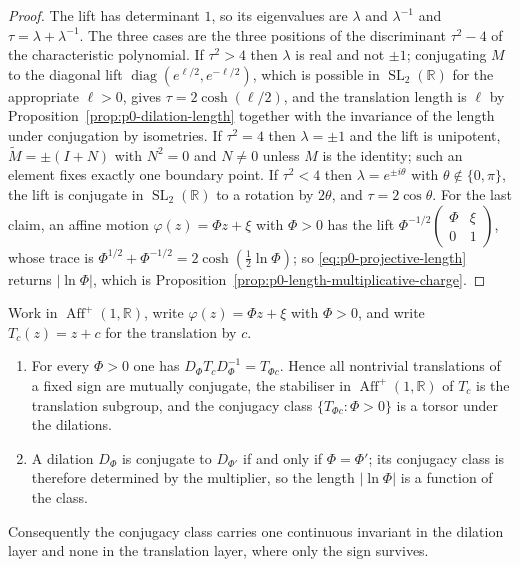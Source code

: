 \begin{proof}
The lift has determinant $1$, so its eigenvalues are $\lambda$ and $\lambda^{-1}$ and
$\tau=\lambda+\lambda^{-1}$.  The three cases are the three positions of the
discriminant $\tau^2-4$ of the characteristic polynomial.  If $\tau^2>4$ then
$\lambda$ is real and not $\pm1$; conjugating $M$ to the diagonal lift
$\operatorname{diag}(e^{\ell/2},e^{-\ell/2})$, which is possible in
$\operatorname{SL}_2(\mathbb R)$ for the appropriate $\ell>0$, gives
$\tau=2\cosh(\ell/2)$, and the translation length is $\ell$ by
Proposition~\ref{prop:p0-dilation-length} together with the invariance of the length
under conjugation by isometries.  If $\tau^2=4$ then $\lambda=\pm1$ and the lift is
unipotent, $\widetilde M=\pm(I+N)$ with $N^2=0$ and $N\neq0$ unless $M$ is the
identity; such an element fixes exactly one boundary point.  If $\tau^2<4$ then
$\lambda=e^{\pm i\theta}$ with $\theta\notin\{0,\pi\}$, the lift is conjugate in
$\operatorname{SL}_2(\mathbb R)$ to a rotation by $2\theta$, and
$\tau=2\cos\theta$.  For the last claim, an affine motion
$\varphi(z)=\Phi z+\xi$ with $\Phi>0$ has the lift
$\Phi^{-1/2}\left(\begin{smallmatrix}\Phi&\xi\\0&1\end{smallmatrix}\right)$, whose
trace is $\Phi^{1/2}+\Phi^{-1/2}=2\cosh(\tfrac12\ln\Phi)$; so
\eqref{eq:p0-projective-length} returns $\lvert\ln\Phi\rvert$, which is
Proposition~\ref{prop:p0-length-multiplicative-charge}.
\end{proof}

\begin{proposition}
\label{prop:p0-affine-two-layers}
Work in $\operatorname{Aff}^{+}(1,\mathbb R)$, write $\varphi(z)=\Phi z+\xi$ with
$\Phi>0$, and write $T_c(z)=z+c$ for the translation by $c$.
\begin{enumerate}
\item For every $\Phi>0$ one has $D_\Phi T_c D_\Phi^{-1}=T_{\Phi c}$.  Hence all
  nontrivial translations of a fixed sign are mutually conjugate, the stabiliser in
  $\operatorname{Aff}^{+}(1,\mathbb R)$ of $T_c$ is the translation subgroup, and
  the conjugacy class $\{T_{\Phi c}:\Phi>0\}$ is a torsor under the dilations.
\item A dilation $D_\Phi$ is conjugate to $D_{\Phi'}$ if and only if
  $\Phi=\Phi'$; its conjugacy class is therefore determined by the multiplier, so
  the length $\lvert\ln\Phi\rvert$ is a function of the class.
\end{enumerate}
Consequently the conjugacy class carries one continuous invariant in the dilation
layer and none in the translation layer, where only the sign survives.
\end{proposition}

